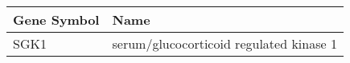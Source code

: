 \begin{tabular}{ll}
\toprule
Gene Symbol &                                    Name \\
\midrule
       SGK1 & serum/glucocorticoid regulated kinase 1 \\
\bottomrule
\end{tabular}
